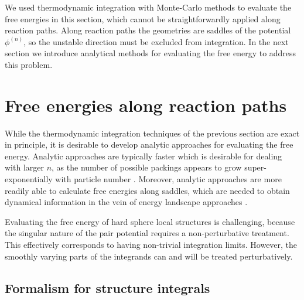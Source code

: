 \documentclass[11pt,twoside]{report}
\begin{document}
We used thermodynamic integration with Monte-Carlo methods to evaluate the free energies in this section, which cannot be straightforwardly applied along reaction paths.
Along reaction paths the geometries are saddles of the potential $\phi^{(n)}$, so the unstable direction must be excluded from integration.
In the next section we introduce analytical methods for evaluating the free energy to address this problem.


\section{Free energies along reaction paths}
\label{sec:reaction-paths}

While the thermodynamic integration techniques of the previous section are exact in principle, it is desirable to develop analytic approaches for evaluating the free energy.
Analytic approaches are typically faster which is desirable for dealing with larger $n$, as the number of possible packings appears to grow super-exponentially with particle number \cite{Holmes-CerfonSR2016}.
Moreover, analytic approaches are more readily able to calculate free energies along saddles, which are needed to obtain dynamical information in the vein of energy landscape approaches \cite{Wales2004}.

Evaluating the free energy of hard sphere local structures is challenging, because the singular nature of the pair potential requires a non-perturbative treatment.
This effectively corresponds to having non-trivial integration limits.
However, the smoothly varying parts of the integrands can and will be treated perturbatively.

\subsection{Formalism for structure integrals}
\label{sec:analytic-integrals}
\end{document}
